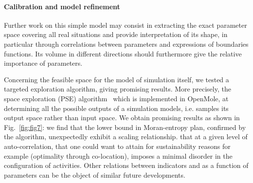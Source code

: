 \documentclass[10pt,letterpaper]{article}
\begin{document}



\paragraph{Calibration and model refinement}

Further work on this simple model may consist in extracting the exact parameter space covering all real situations and provide interpretation of its shape, in particular through  correlations between parameters and expressions of  boundaries functions. Its volume in different directions should furthermore give the relative importance of parameters. 

Concerning the feasible space for the model of simulation itself, we tested a targeted exploration algorithm, giving promising results. More precisely, the  space exploration (PSE) algorithm~\cite{10.1371/journal.pone.0138212} which is implemented in OpenMole,  at determining all the possible outputs of a simulation models, i.e. samples its output space rather than input space. We obtain promising results as shown in Fig.~\ref{fig:fig7}: we find that the lower bound in Moran-entropy plan, confirmed by the algorithm, unexpectedly exhibit a scaling relationship.  that at a given level of auto-correlation, that one could want to attain for sustainability reasons for example (optimality through co-location), imposes a minimal disorder in the configuration of activities. Other relations between indicators and as a function of parameters can be the object of similar future developments.
\end{document}
